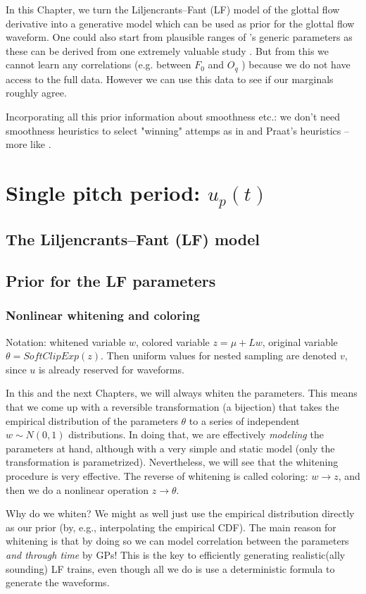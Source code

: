 \begin{chaptersections}{%
In this Chapter, we turn the Liljencrants–Fant (LF) model of the glottal flow derivative into a generative model which can be used as prior for the glottal flow waveform.
}
One could also start from plausible ranges of \citep{Doval2006}'s generic parameters as these can be derived from one extremely valuable study \citep{Holmberg1989,Holmberg1989a}.
But from this we cannot learn any correlations (e.g. between $F_0$ and $O_q$ \citep{Henrich2005}) because we do not have access to the full data.
However we can use this data to see if our marginals roughly agree.

Incorporating all this prior information about smoothness etc.: we don't need smoothness heuristics to select "winning" attemps as in \citep{Barreda2021} and Praat's heuristics -- more like \citep{Mehta2012}.

\section{Single pitch period: $u_p(t)$}

\subsection{The Liljencrants–Fant (LF) model}

\subsection{Prior for the LF parameters}

\subsubsection{Nonlinear whitening and coloring}

Notation: whitened variable $w$, colored variable $z = \mu + Lw$, original variable $\theta = SoftClipExp(z)$. Then uniform values for nested sampling are denoted $v$, since $u$ is already reserved for waveforms.

In this and the next Chapters, we will always whiten the parameters.
This means that we come up with a reversible transformation (a bijection) that takes the empirical distribution of the parameters $\theta$ to a series of independent $w \sim N(0,1)$ distributions.
In doing that, we are effectively \emph{modeling} the parameters at hand, although with a very simple and static model (only the transformation is parametrized).
Nevertheless, we will see that the whitening procedure is very effective.
The reverse of whitening is called coloring: $w \rightarrow z$, and then we do a nonlinear operation $z \rightarrow \theta$.

Why do we whiten?
We might as well just use the empirical distribution directly as our prior (by, e.g., interpolating the empirical CDF).
The main reason for whitening is that by doing so we can model correlation between the parameters \emph{and through time} by GPs!
This is the key to efficiently generating realistic(ally sounding) LF trains, even though all we do is use a deterministic formula to generate the waveforms.


\end{chaptersections}
